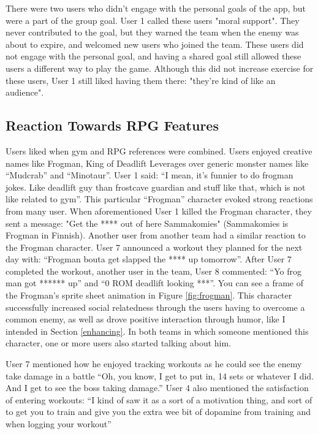 \documentclass{l4proj}
\begin{document}
There were two users who didn't engage with the personal goals of the app, but were a part of the group goal. User 1 called these users "moral support". They never contributed to the goal, but they warned the team when the enemy was about to expire, and welcomed new users who joined the team. These users did not engage with the personal goal, and having a shared goal still allowed these users a different way to play the game. Although this did not increase exercise for these users, User 1 still liked having them there: "they're kind of like an audience". 

\subsection{Reaction Towards RPG Features}
Users liked when gym and RPG references were combined. Users enjoyed creative names like Frogman, King of Deadlift Leverages over generic monster names like ``Mudcrab'' and ``Minotaur''. User 1 said: ``I mean, it's funnier to do frogman jokes. Like deadlift guy than frostcave guardian and stuff like that, which is not like related to gym''. This particular ``Frogman'' character evoked strong reactions from many user. When aforementioned User 1 killed the Frogman character, they sent a message: "Get the **** out of here Sammakomies" (Sammakomies is Frogman in Finnish). Another user from another team had a similar reaction to the Frogman character. User 7 announced a workout they planned for the next day with: ``Frogman bouta get slapped the **** up tomorrow''. After User 7 completed the workout, another user in the team, User 8 commented: ``Yo frog man got ****** up'' and ``0 ROM deadlift looking ***''.  You can see a frame of the Frogman's sprite sheet animation in Figure \ref{fig:frogman}. This character successfully increased social relatedness through the users having to overcome a common enemy, as well as drove positive interaction through humor, like I intended in Section \ref{enhancing}. In both teams in which someone mentioned this character, one or more users also started talking about him.

User 7 mentioned how he enjoyed tracking workouts as he could see the enemy take damage in a battle ``Oh, you know, I get to put in, 14 sets or whatever I did. And I get to see the boss taking damage.'' User 4 also mentioned the satisfaction of entering workouts: ``I kind of saw it as a sort of a motivation thing, and sort of to get you to train and give you the extra wee bit of dopamine from training and when logging your workout''
\end{document}
